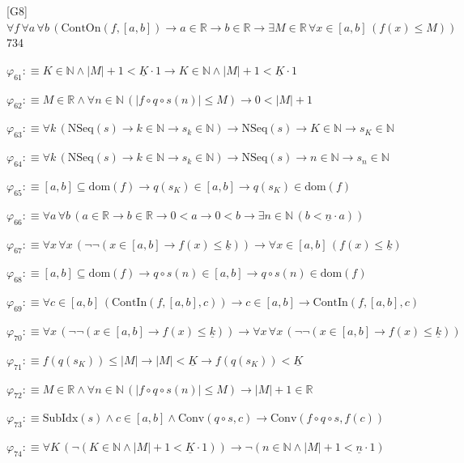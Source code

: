 \begin{fullproof}{[G8]}{$\forall f\,\forall a\,\forall b\,(\mathrm{ContOn}(f,[a,b]) \to a \in \mathbb{R} \to b \in \mathbb{R} \to \exists M \in \mathbb{R}\,\forall x \in [a,b]\,(f(x) \leq M))$}{734}
\begin{abbrevlist}
\item $\varphi_{61} :\equiv K \in \mathbb{N} \land \lvert M \rvert + 1 < \underline{K} \cdot 1 \to K \in \mathbb{N} \land \lvert M \rvert + 1 < \underline{K} \cdot 1$
\item $\varphi_{62} :\equiv M \in \mathbb{R} \land \forall n \in \mathbb{N}\,(\lvert f \circ q \circ s(n) \rvert \leq M) \to 0 < \lvert M \rvert + 1$
\item $\varphi_{63} :\equiv \forall k\,(\mathrm{NSeq}(s) \to k \in \mathbb{N} \to s_{k} \in \mathbb{N}) \to \mathrm{NSeq}(s) \to K \in \mathbb{N} \to s_{K} \in \mathbb{N}$
\item $\varphi_{64} :\equiv \forall k\,(\mathrm{NSeq}(s) \to k \in \mathbb{N} \to s_{k} \in \mathbb{N}) \to \mathrm{NSeq}(s) \to n \in \mathbb{N} \to s_{n} \in \mathbb{N}$
\item $\varphi_{65} :\equiv [a,b] \subseteq \mathrm{dom}(f) \to q(s_{K}) \in [a,b] \to q(s_{K}) \in \mathrm{dom}(f)$
\item $\varphi_{66} :\equiv \forall a\,\forall b\,(a \in \mathbb{R} \to b \in \mathbb{R} \to 0 < a \to 0 < b \to \exists n \in \mathbb{N}\,(b < \underline{n} \cdot a))$
\item $\varphi_{67} :\equiv \forall x\,\forall x\,(\neg \neg (x \in [a,b] \to f(x) \leq \underline{k})) \to \forall x \in [a,b]\,(f(x) \leq \underline{k})$
\item $\varphi_{68} :\equiv [a,b] \subseteq \mathrm{dom}(f) \to q \circ s(n) \in [a,b] \to q \circ s(n) \in \mathrm{dom}(f)$
\item $\varphi_{69} :\equiv \forall c \in [a,b]\,(\mathrm{ContIn}(f,[a,b],c)) \to c \in [a,b] \to \mathrm{ContIn}(f,[a,b],c)$
\item $\varphi_{70} :\equiv \forall x\,(\neg \neg (x \in [a,b] \to f(x) \leq \underline{k})) \to \forall x\,\forall x\,(\neg \neg (x \in [a,b] \to f(x) \leq \underline{k}))$
\item $\varphi_{71} :\equiv f(q(s_{K})) \leq \lvert M \rvert \to \lvert M \rvert < \underline{K} \to f(q(s_{K})) < \underline{K}$
\item $\varphi_{72} :\equiv M \in \mathbb{R} \land \forall n \in \mathbb{N}\,(\lvert f \circ q \circ s(n) \rvert \leq M) \to \lvert M \rvert + 1 \in \mathbb{R}$
\item $\varphi_{73} :\equiv \mathrm{SubIdx}(s) \land c \in [a,b] \land \mathrm{Conv}(q \circ s,c) \to \mathrm{Conv}(f \circ q \circ s,f(c))$
\item $\varphi_{74} :\equiv \forall K\,(\neg (K \in \mathbb{N} \land \lvert M \rvert + 1 < \underline{K} \cdot 1)) \to \neg (n \in \mathbb{N} \land \lvert M \rvert + 1 < \underline{n} \cdot 1)$

\end{abbrevlist}
\end{fullproof}
